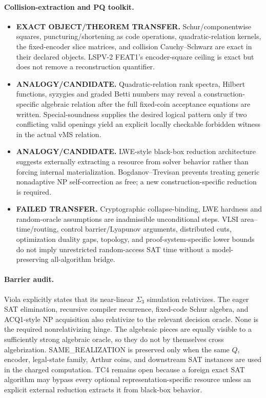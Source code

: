 \documentclass[11pt]{article}
\begin{document}
\paragraph{Collision-extraction and PQ toolkit.}
\begin{itemize}
\item[] \textbf{EXACT OBJECT/THEOREM TRANSFER.} Schur/componentwise squares, puncturing/shortening as code operations, quadratic-relation kernels, the fixed-encoder slice matrices, and collision Cauchy--Schwarz are exact in their declared objects. LSPV-2 FEAT1's encoder-square ceiling is exact but does not remove a reconstruction quantifier.
\item[] \textbf{ANALOGY/CANDIDATE.} Quadratic-relation rank spectra, Hilbert functions, syzygies and graded Betti numbers may reveal a construction-specific algebraic relation after the full fixed-coin acceptance equations are written. Special-soundness supplies the desired logical pattern only if two conflicting valid openings yield an explicit locally checkable forbidden witness in the actual vMS relation.
\item[] \textbf{ANALOGY/CANDIDATE.} LWE-style black-box reduction architecture suggests externally extracting a resource from solver behavior rather than forcing internal materialization. Bogdanov--Trevisan prevents treating generic nonadaptive NP self-correction as free; a new construction-specific reduction is required.
\item[] \textbf{FAILED TRANSFER.} Cryptographic collapse-binding, LWE hardness and random-oracle assumptions are inadmissible unconditional steps. VLSI area--time/routing, control barrier/Lyapunov arguments, distributed cuts, optimization duality gaps, topology, and proof-system-specific lower bounds do not imply unrestricted random-access SAT time without a model-preserving all-algorithm bridge.
\end{itemize}

\paragraph{Barrier audit.}
Viola explicitly states that its near-linear $\Sigma_3$ simulation relativizes. The eager SAT elimination, recursive compiler recurrence, fixed-code Schur algebra, and ACQ1-style NP acquisition also relativize to the relevant decision oracle. None is the required nonrelativizing hinge. The algebraic pieces are equally visible to a sufficiently strong algebraic oracle, so they do not by themselves cross algebrization. SAME\_REALIZATION is preserved only when the same $Q$, encoder, legal-state family, Arthur coins, and downstream SAT instances are used in the charged computation. TC4 remains open because a foreign exact SAT algorithm may bypass every optional representation-specific resource unless an explicit external reduction extracts it from black-box behavior.
\end{document}
